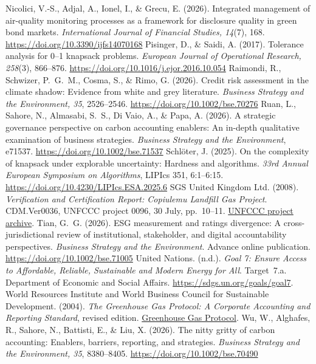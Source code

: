 \begin{thebibliography}{}
 Nicolici, V.-S., Adjal, A., Ionel, I., \& Grecu, E. (2026). Integrated management of air-quality monitoring processes as a framework for disclosure quality in green bond markets. \emph{International Journal of Financial Studies, 14}(7), 168. \url{https://doi.org/10.3390/ijfs14070168}
 Pisinger, D., \& Saidi, A. (2017). Tolerance analysis for 0--1 knapsack problems. \emph{European Journal of Operational Research, 258}(3), 866--876. \url{https://doi.org/10.1016/j.ejor.2016.10.054}
 Raimondi, R., Schwizer, P.~G.~M., Cosma, S., \& Rimo, G. (2026). Credit risk assessment in the climate shadow: Evidence from white and grey literature. \emph{Business Strategy and the Environment, 35}, 2526--2546. \url{https://doi.org/10.1002/bse.70276}
 Ruan, L., Sahore, N., Almasabi, S.~S., Di Vaio, A., \& Papa, A. (2026). A strategic governance perspective on carbon accounting enablers: An in-depth qualitative examination of business strategies. \emph{Business Strategy and the Environment}, e71537. \url{https://doi.org/10.1002/bse.71537}
 Schlöter, J. (2025). On the complexity of knapsack under explorable uncertainty: Hardness and algorithms. \emph{33rd Annual European Symposium on Algorithms}, LIPIcs 351, 6:1--6:15. \url{https://doi.org/10.4230/LIPIcs.ESA.2025.6}
 SGS United Kingdom Ltd. (2008). \emph{Verification and Certification Report: Copiulemu Landfill Gas Project}. CDM.Ver0036, UNFCCC project 0096, 30 July, pp.~10--11. \href{https://cdm.unfccc.int/Projects/DB/DNV-CUK1126875537.72/iProcess/SGS-UKL1188294574.74/ReviewInitialComments/NEXNYPXPNJFC9OOG8BF6DBO3EOC9Q4}{UNFCCC project archive}.
 Tian, G.~G. (2026). ESG measurement and ratings divergence: A cross-jurisdictional review of institutional, stakeholder, and digital accountability perspectives. \emph{Business Strategy and the Environment}. Advance online publication. \url{https://doi.org/10.1002/bse.71005}
 United Nations. (n.d.). \emph{Goal 7: Ensure Access to Affordable, Reliable, Sustainable and Modern Energy for All}. Target~7.a. Department of Economic and Social Affairs. \url{https://sdgs.un.org/goals/goal7}.
 World Resources Institute and World Business Council for Sustainable Development. (2004). \emph{The Greenhouse Gas Protocol: A Corporate Accounting and Reporting Standard}, revised edition. \href{https://ghgprotocol.org/sites/default/files/standards/ghg-protocol-revised.pdf}{Greenhouse Gas Protocol}.
 Wu, W., Alghafes, R., Sahore, N., Battisti, E., \& Liu, X. (2026). The nitty gritty of carbon accounting: Enablers, barriers, reporting, and strategies. \emph{Business Strategy and the Environment, 35}, 8380--8405. \url{https://doi.org/10.1002/bse.70490}
\end{thebibliography}
